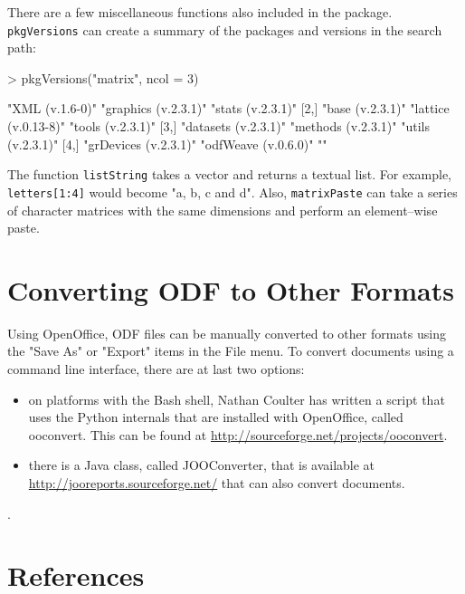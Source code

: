 \documentclass[12pt]{article}
\begin{document}
There are a few miscellaneous functions also included in the package. \texttt{pkgVersions} can create a summary of the packages and versions in the search path:
\begin{Schunk}
\begin{Sinput}
> pkgVersions("matrix", ncol = 3)
\end{Sinput}
\begin{Soutput}
     [,1]                  [,2]                 [,3]             
[1,] "XML (v.1.6-0)"       "graphics (v.2.3.1)" "stats (v.2.3.1)"
[2,] "base (v.2.3.1)"      "lattice (v.0.13-8)" "tools (v.2.3.1)"
[3,] "datasets (v.2.3.1)"  "methods (v.2.3.1)"  "utils (v.2.3.1)"
[4,] "grDevices (v.2.3.1)" "odfWeave (v.0.6.0)" ""               
\end{Soutput}
\end{Schunk}
The function \texttt{listString} takes a vector and returns a textual list. For example,  \verb|letters[1:4]| would become "a, b, c and d". Also, \texttt{matrixPaste} can take a series of character matrices with the same dimensions and perform an element--wise paste.

\section{Converting ODF to Other Formats}

Using OpenOffice, ODF files can be manually converted to other formats using the  "Save As" or "Export" items in the File menu. To convert documents using a command line interface, there are at last two options:
\begin{itemize}
\item on platforms with the Bash shell, Nathan Coulter has written a script that uses the Python internals that are installed with OpenOffice, called ooconvert. This can be found at \linebreak \href{http://sourceforge.net/projects/ooconvert} {http://sourceforge.net/projects/ooconvert}.
\item there is a Java class, called  JOOConverter, that is available at \href{http://jooreports.sourceforge.net/} {http://jooreports.sourceforge.net/} that can also convert documents.
\end{itemize}.



\section{References}
\end{document}
